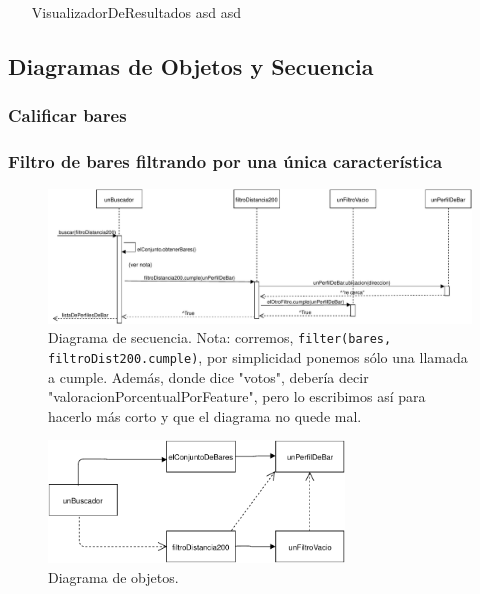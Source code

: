 {\color{red}
\begin{itemize}
  \item[\footnotesize{VisualizadorDeResultados}] asd asd
\end{itemize}
}


\subsection{Diagramas de Objetos y Secuencia}

\subsubsection{Calificar bares}

\subsubsection{Filtro de bares filtrando por una única característica}


\begin{figure}[H]
  \centering
  \includegraphics[width=\textwidth]{diagramas/secuencia_2.pdf}
  \caption{\normalfont Diagrama de secuencia. Nota: corremos, \texttt{filter(bares, filtroDist200.cumple)}, por simplicidad ponemos sólo una llamada a cumple.
Además, donde dice "votos", debería decir "valoracionPorcentualPorFeature", pero lo escribimos así para hacerlo más corto y que el diagrama no quede mal.
	}
\end{figure}

\begin{figure}[H]
  \centering
  \includegraphics[width=0.7\textwidth]{diagramas/objetos_2.pdf}
  \caption{\normalfont Diagrama de objetos.}
\end{figure}

